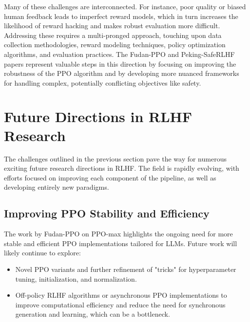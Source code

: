 \documentclass{article} %
\begin{document}
Many of these challenges are interconnected. For instance, poor quality or biased human feedback leads to imperfect reward models, which in turn increases the likelihood of reward hacking and makes robust evaluation more difficult. Addressing these requires a multi-pronged approach, touching upon data collection methodologies, reward modeling techniques, policy optimization algorithms, and evaluation practices. The Fudan-PPO and Peking-SafeRLHF papers represent valuable steps in this direction by focusing on improving the robustness of the PPO algorithm and by developing more nuanced frameworks for handling complex, potentially conflicting objectives like safety.

\section{Future Directions in RLHF Research}
\label{sec:future_directions}

The challenges outlined in the previous section pave the way for numerous exciting future research directions in RLHF. The field is rapidly evolving, with efforts focused on improving each component of the pipeline, as well as developing entirely new paradigms.

\subsection{Improving PPO Stability and Efficiency}
The work by Fudan-PPO on PPO-max \cite{Zheng2023PPO} highlights the ongoing need for more stable and efficient PPO implementations tailored for LLMs. Future work will likely continue to explore:
\begin{itemize}
    \item Novel PPO variants and further refinement of "tricks" for hyperparameter tuning, initialization, and normalization.
    \item Off-policy RLHF algorithms or asynchronous PPO implementations to improve computational efficiency and reduce the need for synchronous generation and learning, which can be a bottleneck. \cite{Tang2024AsyncRLHF}
\end{itemize}
\end{document}
